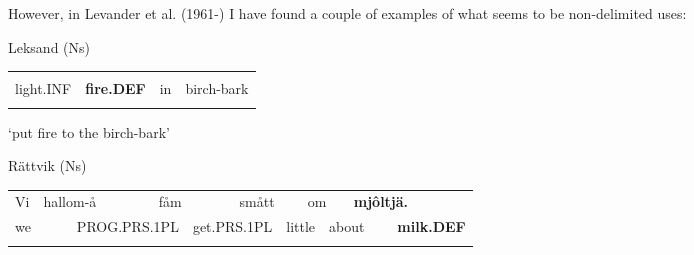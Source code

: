 However, in Levander et al. (1961-) I have found a couple of examples of what seems to be non-delimited uses:

\begin{listWWNumileveli}
\item {}

\begin{styleExample}
\label{bkm:Ref154222785}Leksand (Ns)

\end{styleExample}

\end{listWWNumileveli}

\begin{tabular}{llll}
\lsptoprule
\multicolumn{4}{l}{tännd

}\\
light.INF & {\bfseries fire.DEF} & in & birch-bark\\
\lspbottomrule
\end{tabular}

\begin{styleTranslation}
‘put fire to the birch-bark’

\end{styleTranslation}

\begin{listWWNumileveli}
\item {}

\begin{styleExample}
Rättvik (Ns)

\end{styleExample}

\end{listWWNumileveli}

\begin{tabular}{llllllllllll}
\lsptoprule
Vi & \multicolumn{2}{l}{hallom-å

} & \multicolumn{2}{l}{fåm

} & \multicolumn{2}{l}{smått

} & \multicolumn{2}{l}{om

} & \multicolumn{2}{l}{{\bfseries mjôltjä.}

} & \\
\multicolumn{2}{l}{we

} & \multicolumn{2}{l}{PROG.PRS.1PL

} & \multicolumn{2}{l}{get.PRS.1PL

} & \multicolumn{2}{l}{little

} & \multicolumn{2}{l}{about

} & \multicolumn{2}{l}{{\bfseries milk.DEF}

}\\
\lspbottomrule
\end{tabular}

